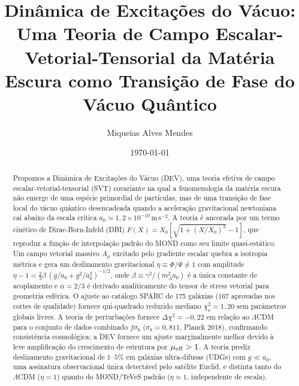 \documentclass[aps,prd,twocolumn,showpacs,superscriptaddress]{revtex4-2}
\newcommand{\aO}{a_0}
\newcommand{\LCDM}{$\Lambda$CDM}
\begin{document}
\title{Dinâmica de Excitações do Vácuo: Uma Teoria de Campo
       Escalar-Vetorial-Tensorial da Matéria Escura como
       Transição de Fase do Vácuo Quântico}

\author{Miqueias Alves Mendes}

\date{\today}

\begin{abstract}
Propomos a Dinâmica de Excitações do Vácuo (DEV), uma teoria
efetiva de campo escalar-vetorial-tensorial (SVT) covariante
na qual a fenomenologia da matéria escura não emerge de uma
espécie primordial de partículas, mas de uma transição de fase
local do vácuo quântico desencadeada quando a aceleração
gravitacional newtoniana cai abaixo da escala crítica
$\aO \simeq 1{,}2\times10^{-10}$\,m\,s$^{-2}$.
A teoria é ancorada por um termo cinético de Dirac-Born-Infeld
(DBI) $F(X) = X_0[\sqrt{1+(X/X_0)^2}-1]$, que reproduz a
função de interpolação padrão do MOND como seu limite
quasi-estático.
Um campo vetorial massivo $A_\mu$ excitado pelo gradiente
escalar quebra a isotropia métrica e gera um deslizamento
gravitacional $\eta \equiv \Phi/\Psi \neq 1$ com amplitude
$\eta - 1 = \frac{2}{3}\beta\,(g/\aO+g^2/\aO^2)^{-1/2}$,
onde $\beta \equiv \gamma^2/(m_A^2 \aO)$ é a única constante
de acoplamento e $\alpha = 2/3$ é derivado analiticamente
do tensor de stress vetorial para geometria esférica.
O ajuste ao catálogo SPARC de 175 galáxias (167 aprovadas
nos cortes de qualidade) fornece qui-quadrado reduzido mediano
$\chi^2_\nu = 1{,}20$ sem parâmetros globais livres.
A teoria de perturbações fornece $\Delta\chi^2 = -0{,}22$
em relação ao \LCDM{} para o conjunto de dados combinado
$f\sigma_8$ ($\sigma_8 = 0{,}811$, Planck 2018), confirmando
consistência cosmológica; a DEV fornece um ajuste marginalmente
melhor devido à leve amplificação do crescimento de estrutura
por $\mu_{\rm eff} > 1$.
A teoria prediz deslizamento gravitacional de $1$--$5\%$
em galáxias ultra-difusas (UDGs) com $g \ll \aO$, uma
assinatura observacional única detectável pelo satélite Euclid,
e distinta tanto do \LCDM{} ($\eta=1$) quanto do MOND/TeVeS
padrão ($\eta\approx 1$, independente de escala).
\end{abstract}

\end{document}
